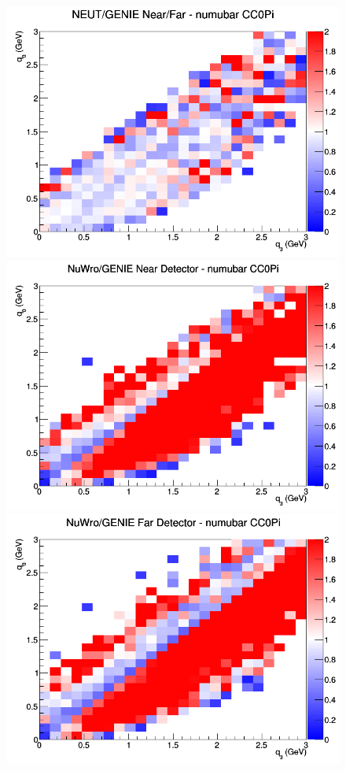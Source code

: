 \documentclass[12pt]{article}
\begin{document}
\begin{figure}[h]
\endminipage
{}
\includegraphics[width=\linewidth]{eff_q0_q3/GAr/ratios/CC0Pi_NEUT_GENIE_numubar_NF_q3_q0.png}
\endminipage
\newline
{}
\includegraphics[width=\linewidth]{eff_q0_q3/GAr/ratios/CC0Pi_NuWro_GENIE_numubar_near_q3_q0.png}
\endminipage
{}
\includegraphics[width=\linewidth]{eff_q0_q3/GAr/ratios/CC0Pi_NuWro_GENIE_numubar_far_q3_q0.png}

\end{figure}
\end{document}
